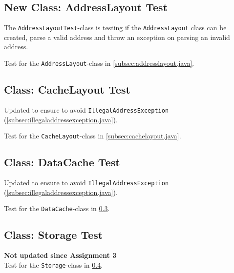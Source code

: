 \documentclass[a4paper]{scrreprt}
\begin{document}
\subsection{New Class: AddressLayout Test}
\label{subsec:addresslayouttest.java}

The \texttt{AddressLayoutTest}-class is testing if the \texttt{AddressLayout} class can be created, parse a valid address and throw an exception on parsing an invalid address.

Test for the \texttt{AddressLayout}-class in \ref{subsec:addresslayout.java}.



\subsection{Class: CacheLayout Test}
\label{subsec:cachelayouttest.java}

Updated to ensure to avoid \texttt{IllegalAddressException} (\ref{subsec:illegaladdressexception.java}).

Test for the \texttt{CacheLayout}-class in \ref{subsec:cachelayout.java}.



\subsection{Class: DataCache Test}
\label{subsec:datacachetest.java}

Updated to ensure to avoid \texttt{IllegalAddressException} (\ref{subsec:illegaladdressexception.java}).

Test for the \texttt{DataCache}-class in \ref{subsec:datacachetest.java}.



\subsection{Class: Storage Test}
\label{subsec:storagetest.java}

\footnotesize\textbf{Not updated since Assignment 3}\\
\normalsize Test for the \texttt{Storage}-class in \ref{subsec:storagetest.java}.


\end{document}
